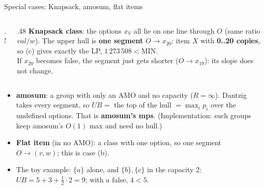 \documentclass[aspectratio=169,11pt]{beamer}
\begin{document}
\begin{frame}{Special cases: Knapsack, amosum, flat items}
\footnotesize
\begin{columns}[T]
\begin{column}{.5\textwidth}
\centering
{}
\end{column}
\begin{column}{.48\textwidth}
\textbf{Knapsack class}: the options $x_V$ all lie on one line through $O$ (same ratio $\textit{val}/w$).
The upper hull is \textbf{one segment} $O \to x_{20}$: item $X$ with \textbf{0..20 copies}, so
(c) gives exactly the LP, $1\,273\,508 < \text{MIN}$.\\[1mm]
If $x_{20}$ becomes false, the segment just gets shorter ($O\to x_{19}$): its slope does not change.
\end{column}
\end{columns}
\vspace{2mm}
\begin{itemize}\setlength\itemsep{2pt}
\item \textbf{amosum}: a group with only an AMO and no capacity ($R = \infty$). Dantzig takes every segment, so
  $UB = $ the top of the hull $= \max_i p_i$ over the undefined options. That is \textbf{amosum's mps}.
  (Implementation: such groups keep amosum's $O(1)$ max and need no hull.)
\item \textbf{Flat item} (in no AMO): a class with one option, so one segment $O \to (v, w)$; this is case (b).
\item The toy example: $\{a\}$ alone, and $\{b\},\{c\}$ in the capacity 2: $UB = 5 + 3 + \frac12\cdot 2 = 9$; with $a$ false, $4 < 5$.
\end{itemize}
\end{frame}
\end{document}
